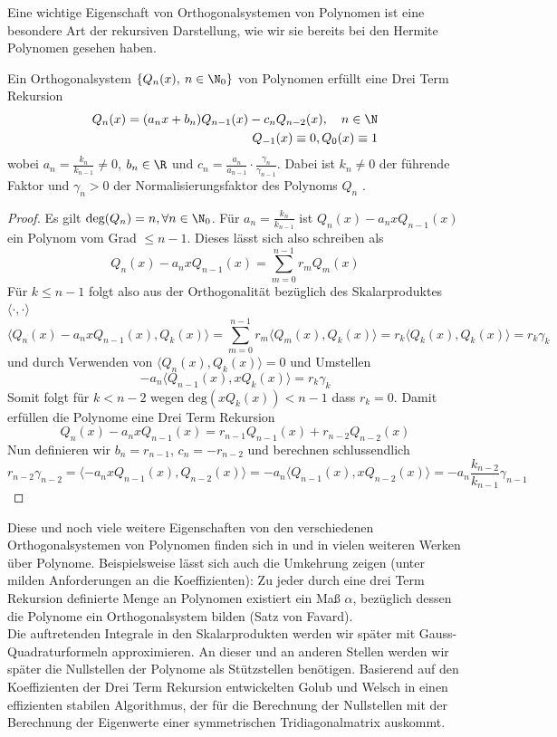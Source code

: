 Eine wichtige Eigenschaft von Orthogonalsystemen von Polynomen ist eine besondere Art der rekursiven Darstellung, wie wir sie bereits bei den Hermite Polynomen gesehen haben.
\begin{maththeorem}
\label{threetermexist}
Ein Orthogonalsystem $\left\lbrace Q_n(x),\: n\in\N_0\right\rbrace$ von Polynomen erfüllt eine Drei Term Rekursion
\begin{eqnarray}
Q_n(x)=(a_nx+b_n)Q_{n-1}(x)-c_nQ_{n-2}(x),\quad n\in\N\\
Q_{-1}(x)\equiv 0, Q_0(x)\equiv 1\nonumber
\end{eqnarray}
wobei $a_n=\frac{k_n}{k_{n-1}}\neq 0$, $b_n\in\R$ und $c_n=\frac{a_n}{a_{n-1}}\cdot \frac{\gamma_n}{\gamma_{n-1}}$.
Dabei ist $k_n\neq 0$ der führende Faktor und $\gamma_n>0$ der Normalisierungsfaktor des Polynoms $Q_n$ . 
\end{maththeorem}
\begin{proof}
Es gilt $\text{deg}(Q_n)=n,\forall n\in\N_0$. Für $a_n=\frac{k_n}{k_{n-1}}$ ist $Q_n(x)-a_nxQ_{n-1}(x)$ ein Polynom vom Grad $\le n-1$. Dieses lässt sich also schreiben als
\[Q_n(x)-a_nxQ_{n-1}(x)=\sum_{m=0}^{n-1}r_mQ_m(x)\]
Für $k\le n-1$ folgt also aus der Orthogonalität bezüglich des Skalarproduktes $\langle\cdot,\cdot\rangle$
\begin{equation*}
\langle Q_n(x)-a_nxQ_{n-1}(x),Q_k(x)\rangle=\sum_{m=0}^{n-1}r_m\langle Q_m(x),Q_k(x)\rangle=r_k\langle Q_k(x),Q_k(x)\rangle=r_k\gamma_k
\end{equation*}
und durch Verwenden von $\langle Q_n(x),Q_k(x)\rangle = 0$ und Umstellen
\[ -a_n\langle Q_{n-1}(x),xQ_k(x)\rangle=r_k\gamma_k\]
Somit folgt für $k<n-2$ wegen $\text{deg}(xQ_k(x))<n-1$ dass $r_k=0$. Damit erfüllen die Polynome eine Drei Term Rekursion
\[Q_n(x)-a_nxQ_{n-1}(x)=r_{n-1}Q_{n-1}(x)+r_{n-2}Q_{n-2}(x)\]
Nun definieren wir $b_n=r_{n-1}$, $c_n=-r_{n-2}$ und berechnen schlussendlich
\[r_{n-2}\gamma_{n-2}=\langle -a_nxQ_{n-1}(x),Q_{n-2}(x)\rangle =-a_n\langle Q_{n-1}(x),xQ_{n-2}(x)\rangle=-a_n\frac{k_{n-2}}{k_{n-1}}\gamma_{n-1}\]
\end{proof}
Diese und noch viele weitere Eigenschaften von den verschiedenen Orthogonalsystemen von Polynomen finden sich in \autocite{weborthopoly} und in vielen weiteren Werken über Polynome. Beispielsweise lässt sich auch die Umkehrung zeigen (unter milden Anforderungen an die Koeffizienten): Zu jeder durch eine drei Term Rekursion definierte Menge an Polynomen existiert ein Maß $\alpha$, bezüglich dessen die Polynome ein Orthogonalsystem bilden (Satz von Favard).\\[0.3cm]
Die auftretenden Integrale in den Skalarprodukten werden wir später mit Gauss-Quadraturformeln approximieren. An dieser und an anderen Stellen werden wir später die Nullstellen der Polynome als Stützstellen benötigen. Basierend auf den Koeffizienten der Drei Term Rekursion entwickelten Golub und Welsch in \autocite{GolubWelsch} einen effizienten stabilen Algorithmus, der für die Berechnung der Nullstellen mit der Berechnung der Eigenwerte einer symmetrischen Tridiagonalmatrix auskommt.


